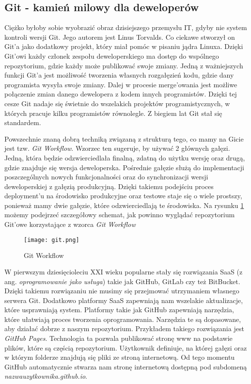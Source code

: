 \subsection{Git - kamień milowy dla deweloperów}
Ciężko byłoby sobie wyobrazić obraz dzisiejszego przemysłu IT, gdyby nie system kontroli wersji Git. Jego autorem jest Linus Torvalds. Co ciekawe stworzył on Git'a jako dodatkowy projekt, który miał pomóc w pisaniu jądra Linuxa. Dzięki Git'owi każdy członek zespołu deweloperskiego ma dostęp do wspólnego repozytorium, gdzie każdy może publikować swoje zmiany. Jedną z ważniejszych funkcji Git'a jest możliwość tworzenia własnych rozgałęzień kodu, gdzie dany programista wysyła swoje zmiany. Dalej w procesie merge'owania jest możliwe połączenie zmian danego dewelopera z kodem innych programistów. Dzięki tej cesze Git nadaje się świetnie do wszelakich projektów programistycznych, w których pracuje kilku programistów równolegle. Z biegiem lat Git stał się standardem.
\par
Powszechnie znaną dobrą techniką związaną z strukturą tego, co mamy na Gicie jest tzw. \textit{Git Workflow}. Wzorzec ten sugeruje, by używać 2 głównych gałęzi. Jedną, która będzie odzwierciedlała finalną, zdatną do użytku wersję oraz drugą, gdzie znajduje się wersja deweloperska. Pośrednie gałęzie służą do implementacji poszczególnych nowych funkcjonalności oraz do synchronizacji wersji deweloperskiej z gałęzią produkcyjną. Dzięki takiemu podejściu proces deployment'u na środowisko produkcyjne oraz testowe staje się o wiele prostszy, ponieważ mamy dwie gałęzie, które odzwierciedlają te środowiska. Na rysunku \ref{fig:git} możemy podejrzeć szczegółowy schemat, jak powinno wyglądać repozytorium Git'owe korzystające z wzorca \textit{Git Workflow}
\begin{figure}[htbp]
    \centering
    \texttt{[image: git.png]}
    \caption{Git Workflow}
    \label{fig:git}
\end{figure}
\par
W pierwszym dziesięcioleciu XXI wieku popularne stały się rozwiązania SaaS (z ang. \textit{oprogramowanie jako usługa}) takie jak GitHub, GitLab czy też BitBucket. Dzięki takiemu rozwiązaniu nie musimy się przejmować utrzymaniem własnego serwera Git. Dodatkowo platformy SaaS zapewniają nam wszelakie aktualizacje, które usprawniają system. Platformy takie jak GitHub zapewniają narzędzia, które ułatwiają proces tworzenia oprogramowania. Narzędzia te są dopasowane, aby działać dobrze z naszym repozytorium. Przykładem takiego rozwiązania jest \textit{GitHub Pages}. Technologia ta pozwala publikować stronę www na podstawie plików, które są częścią repozytorium. Użytkownik definiuje, na której gałęzi oraz w którym folderze znajdują się pliki ze stroną internetową. Od tego momentu GitHub automatycznie stwarza nam stronę internetową dostępną pod subdomeną \textit{nazwauzytkownika.github.io}.

